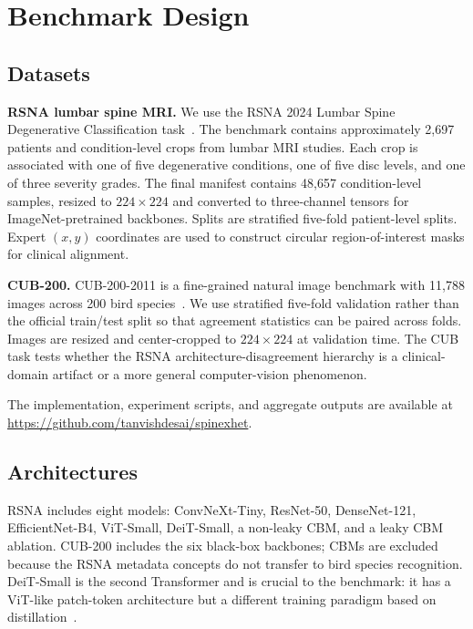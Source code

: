 \documentclass{bmvc2k}
\begin{document}
\section{Benchmark Design}

\subsection{Datasets}

\textbf{RSNA lumbar spine MRI.} We use the RSNA 2024 Lumbar Spine Degenerative Classification task~\cite{rsna2024lumbar}. The benchmark contains approximately 2,697 patients and condition-level crops from lumbar MRI studies. Each crop is associated with one of five degenerative conditions, one of five disc levels, and one of three severity grades. The final manifest contains 48,657 condition-level samples, resized to $224{\times}224$ and converted to three-channel tensors for ImageNet-pretrained backbones. Splits are stratified five-fold patient-level splits. Expert $(x,y)$ coordinates are used to construct circular region-of-interest masks for clinical alignment.

\textbf{CUB-200.} CUB-200-2011 is a fine-grained natural image benchmark with 11,788 images across 200 bird species~\cite{wah2011cub}. We use stratified five-fold validation rather than the official train/test split so that agreement statistics can be paired across folds. Images are resized and center-cropped to $224{\times}224$ at validation time. The CUB task tests whether the RSNA architecture-disagreement hierarchy is a clinical-domain artifact or a more general computer-vision phenomenon.

The implementation, experiment scripts, and aggregate outputs are available at \url{https://github.com/tanvishdesai/spinexhet}.

\subsection{Architectures}

RSNA includes eight models: ConvNeXt-Tiny, ResNet-50, DenseNet-121, EfficientNet-B4, ViT-Small, DeiT-Small, a non-leaky CBM, and a leaky CBM ablation. CUB-200 includes the six black-box backbones; CBMs are excluded because the RSNA metadata concepts do not transfer to bird species recognition. DeiT-Small is the second Transformer and is crucial to the benchmark: it has a ViT-like patch-token architecture but a different training paradigm based on distillation~\cite{touvron2021training}.
\end{document}
